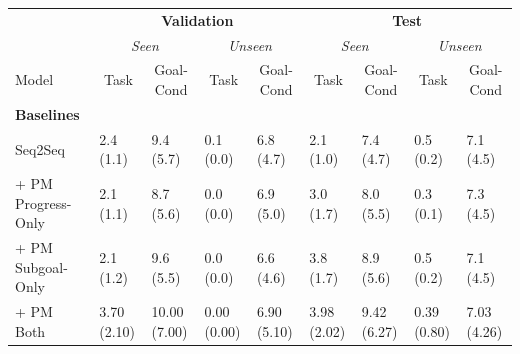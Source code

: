 \documentclass[11pt,a4paper]{article}
\begin{document}
\begin{table}[]
\centering
\resizebox{\textwidth}{!}
{\begin{tabular}{@{}lllllllll@{}}
\toprule
                         & \multicolumn{4}{c}{\textbf{Validation}}                                                                             & \multicolumn{4}{c}{\textbf{Test}}                                                                                   \\
                         & \multicolumn{2}{c}{\textit{Seen}}                        & \multicolumn{2}{c}{\textit{Unseen}}                      & \multicolumn{2}{c}{\textit{Seen}}                        & \multicolumn{2}{c}{\textit{Unseen}}                      \\
Model                    & \multicolumn{1}{c}{Task} & \multicolumn{1}{c}{Goal-Cond} & \multicolumn{1}{c}{Task} & \multicolumn{1}{c}{Goal-Cond} & \multicolumn{1}{c}{Task} & \multicolumn{1}{c}{Goal-Cond} & \multicolumn{1}{c}{Task} & \multicolumn{1}{c}{Goal-Cond} \\ \midrule
\textbf{Baselines}       &                          &                               &                          &                               &                          &                               &                          &                               \\
Seq2Seq \cite{shridhar2020alfred}                  & 2.4 (1.1)                & 9.4 (5.7)                     & 0.1 (0.0)                & 6.8 (4.7)                     & 2.1 (1.0)                & 7.4 (4.7)                     & 0.5 (0.2)                & 7.1 (4.5)                     \\
+ PM Progress-Only       & 2.1 (1.1)                & 8.7 (5.6)                     & 0.0 (0.0)                & 6.9 (5.0)                     & 3.0 (1.7)                & 8.0 (5.5)                     & 0.3 (0.1)                & 7.3 (4.5)                     \\
+ PM Subgoal-Only        & 2.1 (1.2)                & 9.6 (5.5)                     & 0.0 (0.0)                & 6.6 (4.6)                     & 3.8 (1.7)                & 8.9 (5.6)                     & 0.5 (0.2)                & 7.1 (4.5)                     \\
+ PM Both                & 3.70 (2.10)              & 10.00 (7.00)                  & 0.00 (0.00)              & 6.90 (5.10)                   & 3.98 (2.02)              & 9.42 (6.27)                   & 0.39 (0.80)              & 7.03 (4.26)                   \\

\end{tabular}}
\end{table}
\end{document}

